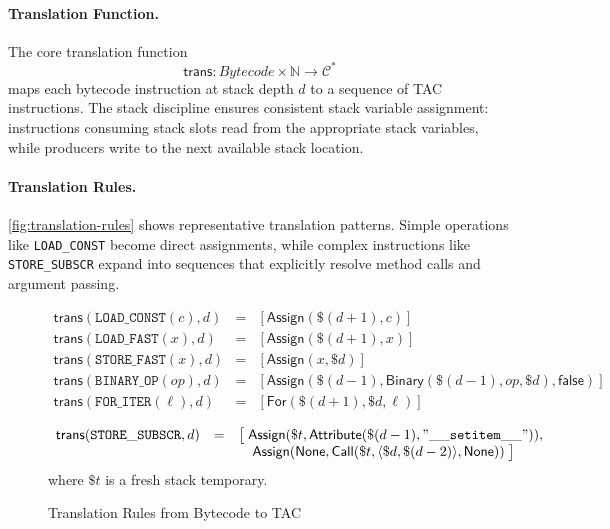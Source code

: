 \paragraph{Translation Function.}
The core translation function
\[
\mathsf{trans} : Bytecode \times \mathbb{N} \to \mathcal{C}^*
\]
maps each bytecode instruction at stack depth $d$ to a sequence of TAC instructions. The stack discipline ensures consistent stack variable assignment: instructions consuming stack slots read from the appropriate stack variables, while producers write to the next available stack location.

\paragraph{Translation Rules.}
\autoref{fig:translation-rules} shows representative translation patterns. Simple operations like \texttt{LOAD_CONST} become direct assignments, while complex instructions like \texttt{STORE_SUBSCR} expand into sequences that explicitly resolve method calls and argument passing.

\begin{figure*}[t]
\centering
\[
\begin{array}{rcl}
\mathsf{trans}(\mathtt{LOAD\_CONST}(c), d) 
  &=& [\mathsf{Assign}(\$(d+1), c)] \\[1ex]

\mathsf{trans}(\mathtt{LOAD\_FAST}(x), d) 
  &=& [\mathsf{Assign}(\$(d+1), x)] \\[1ex]

\mathsf{trans}(\mathtt{STORE\_FAST}(x), d) 
  &=& [\mathsf{Assign}(x, \$d)] \\[1ex]

\mathsf{trans}(\mathtt{BINARY\_OP}(op), d) 
  &=& [\mathsf{Assign}(\$(d-1), \mathsf{Binary}(\$(d-1), op, \$d), \mathsf{false})] \\[1ex]

\mathsf{trans}(\mathtt{FOR\_ITER}(\ell), d) 
  &=& [\mathsf{For}(\$(d+1), \$d, \ell)]
\end{array}
\]

\[
\begin{array}{rcl}
\mathsf{trans}(\mathtt{STORE\_SUBSCR}, d) 
  &=& \big[ \;
     \mathsf{Assign}(\$t, \mathsf{Attribute}(\$(d-1),\mathtt{"\_\_setitem\_\_"})), \\ 
  && \quad \mathsf{Assign}(\mathsf{None}, 
             \mathsf{Call}(\$t, \langle \$d, \$(d-2)\rangle, \mathsf{None})) 
     \;\big]
\end{array}
\]
where $\$t$ is a fresh stack temporary.

\caption{Translation Rules from Bytecode to TAC}
\label{fig:translation-rules}
\end{figure*}

